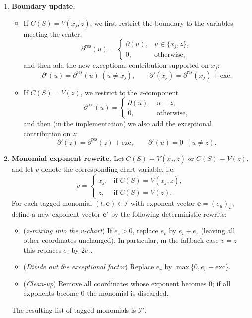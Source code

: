 \documentclass[11pt]{amsart}
\begin{document}
\begin{enumerate}[leftmargin=*]
\item \textbf{Boundary update.}
\begin{itemize}[leftmargin=*]
\item If $C(S)=V(x_j,z)$, we first restrict the boundary to the variables meeting the center,
\[
\partial^{\mathrm{res}}(u)=
\begin{cases}
\partial(u), & u\in\{x_j,z\},\\
0, & \text{otherwise},
\end{cases}
\]
and then add the new exceptional contribution supported on $x_j$:
\[
\partial'(u)=\partial^{\mathrm{res}}(u)\ (u\neq x_j),
\qquad
\partial'(x_j)=\partial^{\mathrm{res}}(x_j)+\mathrm{exc}.
\]
\item If $C(S)=V(z)$, we restrict to the $z$-component
\[
\partial^{\mathrm{res}}(u)=
\begin{cases}
\partial(u), & u=z,\\
0, & \text{otherwise},
\end{cases}
\]
and then (in the implementation) we also add the exceptional contribution on $z$:
\[
\partial'(z)=\partial^{\mathrm{res}}(z)+\mathrm{exc},
\qquad
\partial'(u)=0\ \ (u\neq z).
\]
\end{itemize}

\item \textbf{Monomial exponent rewrite.}
Let $C(S)=V(x_j,z)$ or $C(S)=V(z)$, and let $v$ denote the corresponding chart variable, i.e.
\[
v=
\begin{cases}
x_j, & \text{if } C(S)=V(x_j,z),\\
z, & \text{if } C(S)=V(z).
\end{cases}
\]
For each tagged monomial $(t,\mathbf{e})\in\mathcal I$ with exponent vector $\mathbf{e}=(e_u)_u$, define a new exponent vector $\mathbf{e}'$
by the following deterministic rewrite:
\begin{itemize}[leftmargin=*]
\item (\emph{$z$-mixing into the $v$-chart}) If $e_z>0$, replace $e_v$ by $e_v+e_z$ (leaving all other coordinates unchanged).
      In particular, in the fallback case $v=z$ this replaces $e_z$ by $2e_z$.
\item (\emph{Divide out the exceptional factor}) Replace $e_v$ by $\max\{0,e_v-\mathrm{exc}\}$.
\item (\emph{Clean-up}) Remove all coordinates whose exponent becomes $0$; if all exponents become $0$ the monomial is discarded.
\end{itemize}
The resulting list of tagged monomials is $\mathcal I'$.
\end{enumerate}
\end{document}
